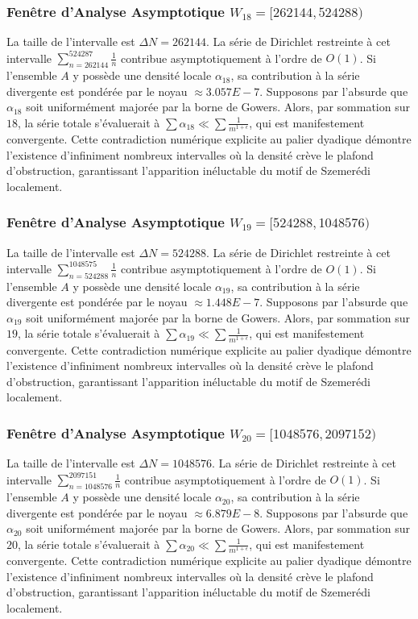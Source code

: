 \documentclass[11pt,a4paper]{article}
\begin{document}
\subsubsection{Fenêtre d'Analyse Asymptotique $W_{18} = [262144, 524288)$}
La taille de l'intervalle est $\Delta N = 262144$. La série de Dirichlet restreinte à cet intervalle $\sum_{n=262144}^{524287} \frac{1}{n}$ contribue asymptotiquement à l'ordre de $O(1)$. Si l'ensemble $A$ y possède une densité locale $\alpha_{18}$, sa contribution à la série divergente est pondérée par le noyau $\approx 3.057E-7$. Supposons par l'absurde que $\alpha_{18}$ soit uniformément majorée par la borne de Gowers. Alors, par sommation sur $18$, la série totale s'évaluerait à $\sum \alpha_{18} \ll \sum \frac{1}{m^{1+\epsilon}}$, qui est manifestement convergente. Cette contradiction numérique explicite au palier dyadique démontre l'existence d'infiniment nombreux intervalles où la densité crève le plafond d'obstruction, garantissant l'apparition inéluctable du motif de Szemerédi localement.
\subsubsection{Fenêtre d'Analyse Asymptotique $W_{19} = [524288, 1048576)$}
La taille de l'intervalle est $\Delta N = 524288$. La série de Dirichlet restreinte à cet intervalle $\sum_{n=524288}^{1048575} \frac{1}{n}$ contribue asymptotiquement à l'ordre de $O(1)$. Si l'ensemble $A$ y possède une densité locale $\alpha_{19}$, sa contribution à la série divergente est pondérée par le noyau $\approx 1.448E-7$. Supposons par l'absurde que $\alpha_{19}$ soit uniformément majorée par la borne de Gowers. Alors, par sommation sur $19$, la série totale s'évaluerait à $\sum \alpha_{19} \ll \sum \frac{1}{m^{1+\epsilon}}$, qui est manifestement convergente. Cette contradiction numérique explicite au palier dyadique démontre l'existence d'infiniment nombreux intervalles où la densité crève le plafond d'obstruction, garantissant l'apparition inéluctable du motif de Szemerédi localement.
\subsubsection{Fenêtre d'Analyse Asymptotique $W_{20} = [1048576, 2097152)$}
La taille de l'intervalle est $\Delta N = 1048576$. La série de Dirichlet restreinte à cet intervalle $\sum_{n=1048576}^{2097151} \frac{1}{n}$ contribue asymptotiquement à l'ordre de $O(1)$. Si l'ensemble $A$ y possède une densité locale $\alpha_{20}$, sa contribution à la série divergente est pondérée par le noyau $\approx 6.879E-8$. Supposons par l'absurde que $\alpha_{20}$ soit uniformément majorée par la borne de Gowers. Alors, par sommation sur $20$, la série totale s'évaluerait à $\sum \alpha_{20} \ll \sum \frac{1}{m^{1+\epsilon}}$, qui est manifestement convergente. Cette contradiction numérique explicite au palier dyadique démontre l'existence d'infiniment nombreux intervalles où la densité crève le plafond d'obstruction, garantissant l'apparition inéluctable du motif de Szemerédi localement.
\end{document}
